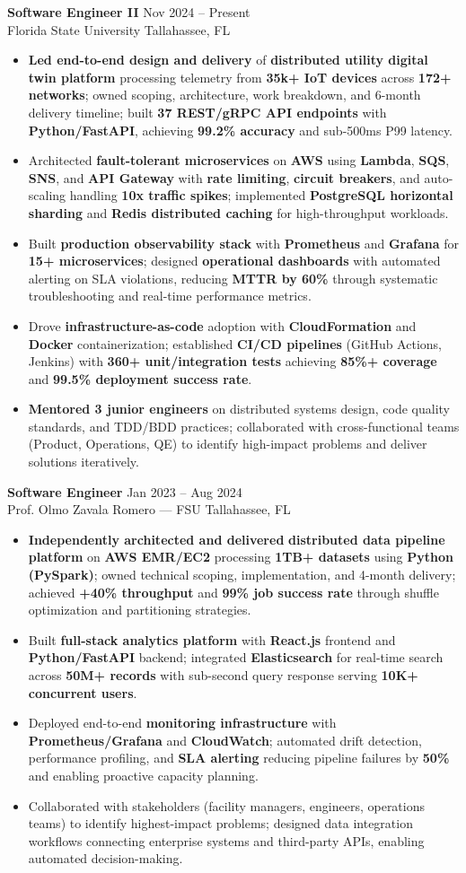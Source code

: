 \documentclass[letterpaper,10pt]{article}
\newcommand{\resumeItem}[1]{\item\small #1}
\newcommand{\resumeSubheading}[4]{
  \vspace{6pt}
  \noindent
  \textbf{#1} \hfill {\footnotesize #2} \\
  [-1pt]
  \noindent
  \small #3 \hfill {\small #4}
  \vspace{3pt}
}
\newcommand{\resumeItemsStart}{\vspace{-2pt}\begin{itemize}}
\newcommand{\resumeItemsEnd}{\end{itemize}\vspace{6pt}}
\begin{document}
\resumeSubheading
{Software Engineer II}{Nov 2024 -- Present}
{Florida State University}{Tallahassee, FL}
\resumeItemsStart
\resumeItem{\textbf{Led end-to-end design and delivery} of \textbf{distributed utility digital twin platform} processing telemetry from \textbf{35k+ IoT devices} across \textbf{172+ networks}; owned scoping, architecture, work breakdown, and 6-month delivery timeline; built \textbf{37 REST/gRPC API endpoints} with \textbf{Python/FastAPI}, achieving \textbf{99.2\% accuracy} and sub-500ms P99 latency.}
\resumeItem{Architected \textbf{fault-tolerant microservices} on \textbf{AWS} using \textbf{Lambda}, \textbf{SQS}, \textbf{SNS}, and \textbf{API Gateway} with \textbf{rate limiting}, \textbf{circuit breakers}, and auto-scaling handling \textbf{10x traffic spikes}; implemented \textbf{PostgreSQL horizontal sharding} and \textbf{Redis distributed caching} for high-throughput workloads.}
\resumeItem{Built \textbf{production observability stack} with \textbf{Prometheus} and \textbf{Grafana} for \textbf{15+ microservices}; designed \textbf{operational dashboards} with automated alerting on SLA violations, reducing \textbf{MTTR by 60\%} through systematic troubleshooting and real-time performance metrics.}
\resumeItem{Drove \textbf{infrastructure-as-code} adoption with \textbf{CloudFormation} and \textbf{Docker} containerization; established \textbf{CI/CD pipelines} (GitHub Actions, Jenkins) with \textbf{360+ unit/integration tests} achieving \textbf{85\%+ coverage} and \textbf{99.5\% deployment success rate}.}
\resumeItem{\textbf{Mentored 3 junior engineers} on distributed systems design, code quality standards, and TDD/BDD practices; collaborated with cross-functional teams (Product, Operations, QE) to identify high-impact problems and deliver solutions iteratively.}
\resumeItemsEnd
\vspace{-12pt}

\resumeSubheading
{Software Engineer}{Jan 2023 -- Aug 2024}
{Prof. Olmo Zavala Romero — FSU}{Tallahassee, FL}
\resumeItemsStart
\resumeItem{\textbf{Independently architected and delivered} \textbf{distributed data pipeline platform} on \textbf{AWS EMR/EC2} processing \textbf{1TB+ datasets} using \textbf{Python (PySpark)}; owned technical scoping, implementation, and 4-month delivery; achieved \textbf{+40\% throughput} and \textbf{99\% job success rate} through shuffle optimization and partitioning strategies.}
\resumeItem{Built \textbf{full-stack analytics platform} with \textbf{React.js} frontend and \textbf{Python/FastAPI} backend; integrated \textbf{Elasticsearch} for real-time search across \textbf{50M+ records} with sub-second query response serving \textbf{10K+ concurrent users}.}
\resumeItem{Deployed end-to-end \textbf{monitoring infrastructure} with \textbf{Prometheus/Grafana} and \textbf{CloudWatch}; automated drift detection, performance profiling, and \textbf{SLA alerting} reducing pipeline failures by \textbf{50\%} and enabling proactive capacity planning.}
\resumeItem{Collaborated with stakeholders (facility managers, engineers, operations teams) to identify highest-impact problems; designed data integration workflows connecting enterprise systems and third-party APIs, enabling automated decision-making.}
\resumeItemsEnd
\vspace{-12pt}
\end{document}
